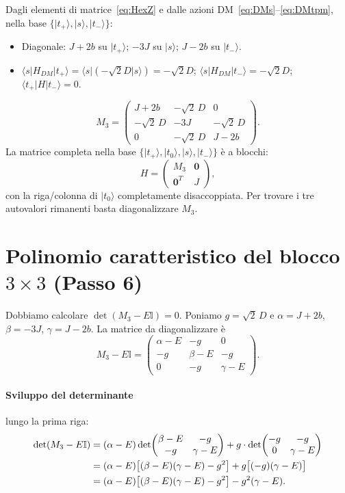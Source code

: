 \documentclass[11pt,a4paper]{article}
\newcommand{\ket}[1]{\lvert #1 \rangle}
\newcommand{\bra}[1]{\langle #1 \rvert}
\newcommand{\melem}[3]{\langle #1 \vert #2 \vert #3 \rangle}
\renewcommand{\vec}[1]{\boldsymbol{#1}}
\theoremstyle{definition}
\begin{document}
Dagli elementi di matrice~\eqref{eq:HexZ} e dalle azioni DM~\eqref{eq:DMs}--\eqref{eq:DMtpm},
nella base $\{\ket{t_+},\ket{s},\ket{t_-}\}$:
\begin{itemize}[nosep]
\item Diagonale: $J+2b$ su $\ket{t_+}$; $-3J$ su $\ket{s}$; $J-2b$ su $\ket{t_-}$.
\item $\melem{s}{H_{DM}}{t_+}=\bra{s}(-\sqrt2 D\ket{s})=-\sqrt2 D$;
$\melem{s}{H_{DM}}{t_-}=-\sqrt2 D$; $\melem{t_+}{H}{t_-}=0$.
\end{itemize}
\begin{equation}
M_3=\begin{pmatrix}J+2b & -\sqrt{2}\,D & 0\\ -\sqrt{2}\,D & -3J & -\sqrt{2}\,D\\ 0 & -\sqrt{2}\,D & J-2b\end{pmatrix}.
\label{eq:M3}
\end{equation}
La matrice completa nella base $\{\ket{t_+},\ket{t_0},\ket{s},\ket{t_-}\}$ è a blocchi:
\[
H=\begin{pmatrix}M_3&\vec 0\\\vec 0^T&J\end{pmatrix},
\]
con la riga/colonna di $\ket{t_0}$ completamente disaccoppiata. Per trovare i tre autovalori
rimanenti basta diagonalizzare $M_3$.

\FloatBarrier
\section{Polinomio caratteristico del blocco $3\times3$ (Passo 6)}

Dobbiamo calcolare $\det(M_3-E\mathbb I)=0$. Poniamo $g=\sqrt2\,D$ e $\alpha=J+2b$, $\beta=-3J$,
$\gamma=J-2b$. La matrice da diagonalizzare è
\[
M_3-E\mathbb I=\begin{pmatrix}\alpha-E & -g & 0\\ -g & \beta-E & -g\\ 0 & -g & \gamma-E\end{pmatrix}.
\]

\paragraph{Sviluppo del determinante} lungo la prima riga:
\begin{align}
\det(M_3-E\mathbb I)
&=(\alpha-E)\det\!\begin{pmatrix}\beta-E&-g\\-g&\gamma-E\end{pmatrix}
+g\cdot\det\!\begin{pmatrix}-g&-g\\0&\gamma-E\end{pmatrix}\notag\\
&=(\alpha-E)\bigl[(\beta-E)(\gamma-E)-g^2\bigr]+g\bigl[(-g)(\gamma-E)\bigr]\notag\\
&=(\alpha-E)\bigl[(\beta-E)(\gamma-E)-g^2\bigr]-g^2(\gamma-E).
\label{eq:det1}
\end{align}
\end{document}
